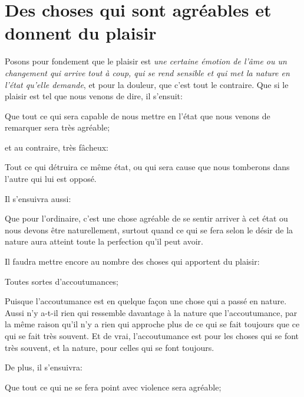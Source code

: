 
\section{Des choses qui sont agréables et donnent du plaisir}

Posons pour fondement que le plaisir est \emph{une certaine émotion de l’âme  ou un changement qui arrive
tout à coup, qui se rend sensible et qui met la nature en l'état qu'elle demande}, et pour la douleur, que
c'est tout le contraire. Que si le plaisir est tel que nous venons de dire, il s'ensuit:

\begin{lieu}
	Que tout ce qui sera capable de nous mettre en l'état que nous venons de remarquer sera très agréable;
\end{lieu}

et au contraire, très fâcheux:

\begin{lieu}
	Tout ce qui détruira ce même état, ou qui sera cause que nous tomberons dans l'autre qui lui est opposé.
\end{lieu}

\bigbreak

Il s'ensuivra aussi:

\begin{lieu}
	Que pour l'ordinaire, c'est une chose agréable de se sentir arriver à cet état ou nous devons être
	naturellement, surtout quand ce qui se fera selon le désir de la nature aura atteint toute la perfection
	qu'il peut avoir. 
\end{lieu}

\bigbreak

Il faudra mettre encore au nombre des choses qui apportent du plaisir:

\begin{lieu}
	Toutes sortes d'accoutumances;
\end{lieu}

Puisque l'accoutumance est en quelque façon une chose qui a passé en nature. Aussi n'y a-t-il rien qui
ressemble davantage à la nature que l'accoutumance, par la même raison qu'il n'y a rien qui approche plus
de ce qui se fait toujours que ce qui se fait très souvent. Et de vrai, l'accoutumance est pour les choses
qui se font très souvent, et la nature, pour celles qui se font toujours.

\bigbreak

De plus, il s'ensuivra:

\begin{lieu}
	Que tout ce qui ne se fera point avec violence sera agréable;
\end{lieu}

